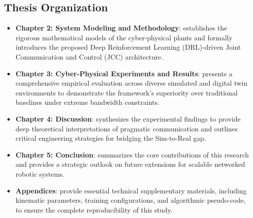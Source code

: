 \subsection{Thesis Organization}
\begin{itemize}
    \item \textbf{Chapter 2: System Modeling and Methodology}: establishes the rigorous mathematical models of the cyber-physical plants and formally introduces the proposed Deep Reinforcement Learning (DRL)-driven Joint Communication and Control (JCC) architecture.
    \item \textbf{Chapter 3: Cyber-Physical Experiments and Results}: presents a comprehensive empirical evaluation across diverse simulated and digital twin environments to demonstrate the framework's superiority over traditional baselines under extreme bandwidth constraints.
    \item \textbf{Chapter 4: Discussion}: synthesizes the experimental findings to provide deep theoretical interpretations of pragmatic communication and outlines critical engineering strategies for bridging the Sim-to-Real gap.
    \item \textbf{Chapter 5: Conclusion}: summarizes the core contributions of this research and provides a strategic outlook on future extensions for scalable networked robotic systems.
    \item \textbf{Appendices}: provide essential technical supplementary materials, including kinematic parameters, training configurations, and algorithmic pseudo-code, to ensure the complete reproducibility of this study.
\end{itemize}
